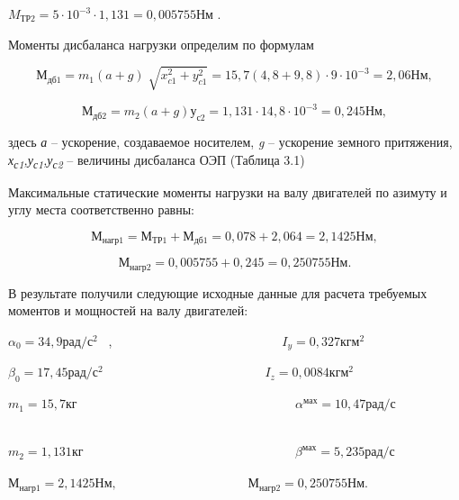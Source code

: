 \( M_{ТР2}=5⋅10^{-3}⋅1,131=0,005755Нм \)  .\par

Моменты дисбаланса нагрузки определим по формулам\par

\[ М_{дб1}=m_{1} \left( a+g \right) \sqrt[]{x_{c1}^{2}+y_{c1}^{2}}=15,7 \left( 4,8+9,8 \right) ⋅9⋅10^{-3}=2,06Нм, \] \par

\[ М_{дб2}=m_{2} \left( a+g \right) у_{с2}=1,131⋅14,8⋅10^{-3}=0,245Нм, \] \par

здесь \textit{а }– ускорение, создаваемое носителем, \textit{g} – ускорение земного притяжения, \textit{х\textsubscript{с1},у\textsubscript{с1},у\textsubscript{с2}} – величины дисбаланса ОЭП (Таблица 3.1)\par

Максимальные статические моменты нагрузки на валу двигателей по азимуту и углу места соответственно равны:\par

\[ М_{нагр1}=М_{ТР1}+М_{дб1}=0,078+2,064=2,1425Нм, \] \par

\[ М_{нагр2}=0,005755+0,245=0,250755Нм. \] \par

В результате получили следующие исходные данные для расчета требуемых моментов и мощностей на валу двигателей:\par


\(  \alpha _{0}=34,9рад/с^{2} \) \  ,\ \ \ \ \ \ \ \ \ \ \ \ \ \ \ \ \ \ \ \ \ \ \ \ \ \ \   \( I_{y}=0,327кгм^{2} \) \par

\(  \beta _{0}=17,45рад/с^{2} \) \ \ \ \ \ \ \ \ \ \ \ \ \ \ \ \ \ \ \ \ \ \ \ \ \   \( I_{z}=0,0084кгм^{2} \) \par

\( m_{1}=15,7кг \) \ \ \ \ \ \ \ \ \ \ \ \ \ \ \ \ \ \ \ \ \ \ \ \ \ \ \ \ \ \ \ \ \ \   \(  \alpha ^{мах}_{}=10,47рад/с \) \ \ \ \ \ \ \ \ \ \ \ \ \ \ \ \ \ \ \ \ \ \ \ \  \par

\( m_{2}=1,131кг \) \ \ \ \ \ \ \ \ \ \ \ \ \ \ \ \ \ \ \ \ \ \ \ \ \ \ \ \ \ \ \ \ \   \(  \beta ^{мах}_{}=5,235рад/с \) \par

\( М_{нагр1}=2,1425Нм, \) \ \ \ \ \ \ \ \ \ \ \ \ \ \ \ \ \ \ \ \   \( М_{нагр2}=0,250755Нм. \) \par

